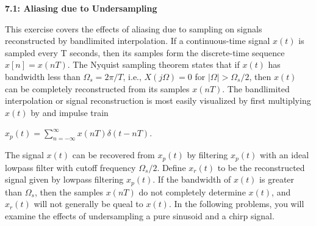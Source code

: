 \begin{LARGE}
  \textbf{7.1: Aliasing due to Undersampling}
\end{LARGE}

\hspace*{\fill}

This exercise covers the effects of aliasing due to sampling on signals reconstructed by bandlimited interpolation. If a continuous-time signal $ x(t)$ is sampled every T seconds, then its samples form the discrete-time sequence $x[n] = x(nT)$. The Nyquist sampling theorem states that if $x(t)$ has bandwidth less than $\Omega_s = 2\pi/T$, i.e., $X(j\Omega) = 0$ for $|\Omega| > \Omega_s/2$, then $x(t)$ can be completely reconstructed from its samples $x(nT)$. The bandlimited interpolation or signal reconstruction is most easily visualized by first multiplying $x(t)$ by and impulse train 

\begin{center}
$ x_p(t) = \sum\limits_{n=-\infty}^\infty x(nT) \delta (t-nT) $.
\end{center}
  
The signal $x(t)$ can be recovered from $x_p(t)$ by filtering $x_p(t)$ with an ideal lowpass filter with cutoff frequency $ \Omega_s/2 $. Define $x_r(t) $ to be the reconstructed signal given by lowpass filtering $x_p(t)$. If the bandwidth of $x(t) $ is greater than $\Omega_s$, then the samples $x(nT)$ do not completely determine $x(t)$, and $x_r(t)$ will not generally be queal to $x(t)$. In the following problems, you will examine the effects of undersampling a pure sinusoid and a chirp signal.

